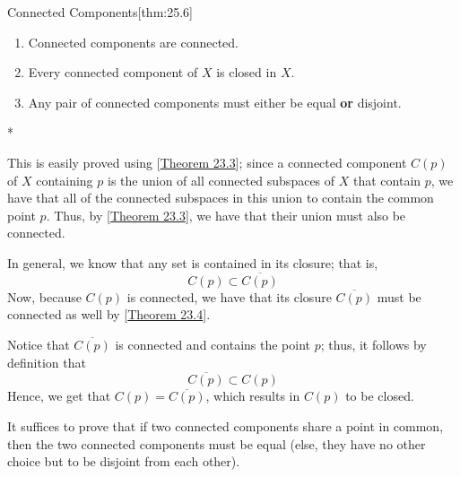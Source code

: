 \begin{thmBox}{Connected Components}[thm:25.6]
    \begin{enumerate}[label = (\alph*)]
        \item Connected components are connected.
        \item Every connected component of \( X \) is closed in \( X \).
        \item Any pair of connected components must either be equal \textbf{or}
            disjoint.
    \end{enumerate}

    \baseRule

    \begin{proofBox}*

        This is easily proved using [\hyperlink{thm:23.3}{Theorem 23.3}];
        since a connected component \( C ( p ) \) of \( X \) containing \( p \) 
        is the union of all connected subspaces of \( X \) that contain \( p \),
        we have that all of the connected subspaces in this union to contain the
        common point \( p \). 
        Thus, by [\hyperlink{thm:23.3}{Theorem 23.3}], we have that their union
        must also be connected.

        \baseSkip 

        In general, we know that any set is contained in its closure; that is,
        \begin{equation*}
            C ( p ) \subset \overline{ C ( p ) }
        \end{equation*}
        Now, because \( C ( p ) \) is connected, we have that its closure 
        \( \overline{ C ( p ) } \) must be connected as well by 
        [\hyperlink{thm:23.4}{Theorem 23.4}].

        \baseSkip 

        Notice that \( \overline{ C ( p ) } \) is connected and contains the 
        point \( p \); thus, it follows by definition that
        \begin{equation*}
            \overline{ C ( p ) } \subset C ( p )
        \end{equation*}
        Hence, we get that \( C ( p ) = \overline{ C ( p ) } \), which results
        in \( C ( p ) \) to be closed.

        \baseSkip

        It suffices to prove that if two connected components share a point in
        common, then the two connected components must be equal (else, they
        have no other choice but to be disjoint from each other).


\end{proofBox}
\end{thmBox}

